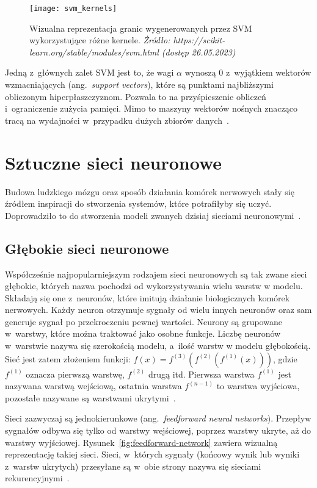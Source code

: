\begin{figure}[h]
    \centering
    \texttt{[image: svm\_kernels]}
    \caption{Wizualna reprezentacja granic wygenerowanych przez SVM wykorzystujące różne kernele. \textit{Żródło: https://scikit-learn.org/stable/modules/svm.html (dostęp 26.05.2023)}}
    \label{fig:svm-kernels}
\end{figure}

Jedną z~głównych zalet SVM jest to, że wagi \(\alpha\) wynoszą 0 z~wyjątkiem wektorów wzmacniających (ang.~\textit{support vectors}), które są punktami najbliższymi obliczonym hiperpłaszczyznom.
Pozwala to na przyśpieszenie obliczeń i~ograniczenie zużycia pamięci.
Mimo to maszyny wektorów nośnych znacząco tracą na wydajności w~przypadku dużych zbiorów danych~\cite{Russell2020, Goodfellow2016}.

\section{Sztuczne sieci neuronowe}\label{sec:sztuczne-sieci-neuronowe}

Budowa ludzkiego mózgu oraz sposób działania komórek nerwowych stały się źródłem inspiracji do stworzenia systemów, które potrafiłyby się uczyć.
Doprowadziło to do stworzenia modeli zwanych dzisiaj sieciami neuronowymi~\cite{Russell2020}.

\subsection{Głębokie sieci neuronowe}\label{subsec:gebokie-sieci-neuronowe}

Współcześnie najpopularniejszym rodzajem sieci neuronowych są tak zwane sieci głębokie, których nazwa pochodzi od wykorzystywania wielu warstw w modelu.
Składają się one z~neuronów, które imitują działanie biologicznych komórek nerwowych.
Każdy neuron otrzymuje sygnały od wielu innych neuronów oraz sam generuje sygnał po przekroczeniu pewnej wartości.
Neurony są grupowane w~warstwy, które można traktować jako osobne funkcje.
Liczbę neuronów w~warstwie nazywa się szerokością modelu, a~ilość warstw w modelu głębokością.
Sieć jest zatem złożeniem funkcji: \(f(x) = f^{(3)}(f^{(2)}(f^{(1)}(x)))\), gdzie \(f^{(1)}\) oznacza pierwszą warstwę, \(f^{(2)}\) drugą itd.
Pierwsza warstwa \(f^{(1)}\) jest nazywana warstwą wejściową, ostatnia warstwa \(f^{(n - 1)}\) to warstwa wyjściowa, pozostałe nazywane są warstwami ukrytymi~\cite{Goodfellow2016}.

Sieci zazwyczaj są jednokierunkowe (ang.~\textit{feedforward neural networks}).
Przepływ sygnałów odbywa się tylko od warstwy wejściowej, poprzez warstwy ukryte, aż do warstwy wyjściowej.
Rysunek~\ref{fig:feedforward-network} zawiera wizualną reprezentację takiej sieci.
Sieci, w~których sygnały (końcowy wynik lub wyniki z~warstw ukrytych) przesyłane są w~obie strony nazywa się sieciami rekurencyjnymi~\cite{Goodfellow2016}.

